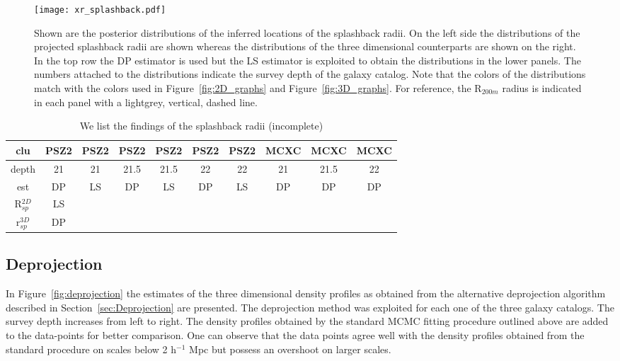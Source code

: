 \documentclass[a4paper,fleqn,usenatbib]{mnras}
\begin{document}
\begin{figure}
    \texttt{[image: xr\_splashback.pdf]}
\caption{Shown are the posterior distributions of the inferred locations of the splashback radii. On the left side the distributions of the projected splashback radii are shown whereas the distributions of the three dimensional counterparts are shown on the right. In the top row the DP estimator is used but the LS estimator is exploited to obtain the distributions in the lower panels. The numbers attached to the distributions indicate the survey depth of the galaxy catalog. Note that the colors of the distributions match with the colors used in Figure~\ref{fig:2D_graphs} and Figure~\ref{fig:3D_graphs}. For reference, the R$_{200m}$ radius is indicated in each panel with a lightgrey, vertical, dashed line.}
   \label{fig:splashback} 
\end{figure}

\begin{table}
    \centering
    \caption{We list the findings of the splashback radii (incomplete)}
    \label{tab:splashbacks}
    \begin{tabular}{|c|c|c|c|c|c|c|c|c|c|}
    \hline
    clu & PSZ2 & PSZ2 & PSZ2 & PSZ2 & PSZ2 & PSZ2 & MCXC & MCXC & MCXC \\ 
    \hline 
    depth & 21 & 21 & 21.5 & 21.5 & 22 & 22 & 21 & 21.5 & 22\\ 
    \hline
   est & DP & LS & DP & LS & DP & LS & DP & DP & DP\\ 
    \hline 
   R$_{sp}^{2D}$ & LS & & & & & & & &\\ 
    \hline 
   r$_{sp}^{3D}$ & DP & & & & & & & &\\
    \end{tabular} 
\end{table}


\subsection{Deprojection}
In Figure~\ref{fig:deprojection} the estimates of the three dimensional density profiles as obtained from the alternative deprojection algorithm described in Section~\ref{sec:Deprojection} are presented. The deprojection method was exploited for each one of the three galaxy catalogs. The survey depth increases from left to right. The density profiles obtained by the standard MCMC fitting procedure outlined above are added to the data-points for better comparison. One can observe that the data points agree well with the density profiles obtained from the standard procedure on scales below 2 h$^{-1}$ Mpc but possess an overshoot on larger scales.
\end{document}
